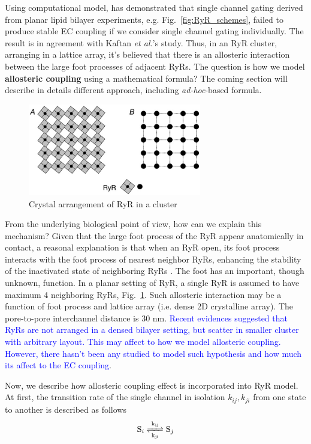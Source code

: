 Using computational model, \citep{stern1999lcm} has demonstrated that single
channel gating derived from planar lipid bilayer experiments, e.g.
Fig.~\ref{fig:RyR_schemes}, failed to produce stable EC coupling if we consider
single channel gating individually. The result is in agreement with Kaftan {\it
et al.}'s study.  Thus, in an RyR cluster, arranging in a lattice array, it's
believed that there is an allosteric interaction between the large foot
processes of adjacent RyRs. The question is how we model {\bf allosteric
coupling} using a mathematical formula? The coming section will describe in
details different approach, including {\it ad-hoc}-based formula.

\begin{figure}[hbt]
  \centerline{\includegraphics[height=4cm,
    angle=0]{./images/RyR_schematic.eps}}
  \caption{Crystal arrangement of RyR in a cluster~\citep{groff2008}}
\label{fig:RyR_schematic}
\end{figure}

From the underlying biological point of view, how can we explain this mechanism?
Given that the large foot process of the RyR appear anatomically in contact, a
reasonal explanation is that when an RyR open, its foot process interacts with
the foot process of nearest neighbor RyRs, enhancing the stability of the
inactivated state of neighboring RyRs \citep{stern1999lcm}. The foot has an
important, though unknown, function. In a planar setting of RyR, a single RyR is
assumed to have maximum 4 neighboring RyRs, Fig.~\ref{fig:RyR_schematic}. Such
allosteric interaction may be a function of foot process and lattice array (i.e.
dense 2D crystalline array).  The pore-to-pore interchannel distance is 30 nm.
\textcolor{blue}{Recent evidences suggested that RyRs are not arranged in a
densed bilayer setting, but scatter in smaller cluster with arbitrary layout.
This may affect to how we model allosteric coupling. However, there hasn't been
any studied to model such hypothesis and how much its affect to the EC
coupling}.

Now, we describe how allosteric coupling effect is incorporated into RyR model.
At first, the transition rate of the single channel in isolation $k_{ij},
k_{ji}$ from one state to another is described as follows
\begin{equation}
  \label{eq:1123}
  \ce{S_i <=>[k_{ij}][k_{ji}]S_j}
\end{equation}

